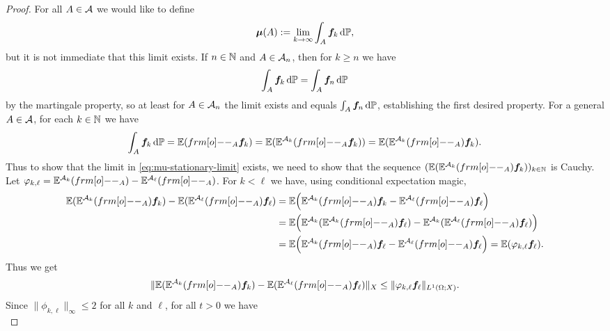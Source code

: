 \begin{proof}
  For all $A \in \mathcal{A}$ we would like to define
  \begin{equation}\label{eq:mu-stationary-limit}
    \bm{\mu}(A) := \lim_{k \to \infty} \int_A \bm{f}_k \, \mathrm{d}\mathbb{P},
  \end{equation}
  but it is not immediate that this limit exists.
  If $n \in \mathbb{N}$ and $A \in \mathcal{A}_{n}$, then for $k \geq n$ we have
  \begin{equation*}
    \int_A \bm{f}_k \, \mathrm{d}\mathbb{P} = \int_A \bm{f}_n \, \mathrm{d} \mathbb{P}
  \end{equation*}
  by the martingale property, so at least for $A \in \mathcal{A}_{n}$ the limit exists and equals $\int_A \bm{f}_n \, \mathrm{d}\mathbb{P}$, establishing the first desired property.
  For a general $A \in \mathcal{A}$, for each $k \in \mathbb{N}$ we have
  \begin{equation*}
     \int_A \mb{f}_k \, \dd\P = \E( \1_{A}\mb{f}_k) = \E(\E^{\mc{A}_k}( \1_{A} \mb{f}_k)) = \E(\E^{\mc{A}_k}(\1_{A}) \mb{f}_k ).
   \end{equation*}
   Thus to show that the limit in \eqref{eq:mu-stationary-limit} exists, we need to show that the sequence $(\E(\E^{\mc{A}_k}( \1_{A}) \mb{f}_k ))_{k \in \N}$ is Cauchy.
   Let $\phi_{k,\ell} = \E^{\mc{A}_k}(\1_{A}) - \E^{\mc{A}_\ell}( \1_{A})$.
   For $k < \ell$ we have, using conditional expectation magic,
   \begin{equation*}
     \begin{aligned}
       \E(\E^{\mc{A}_k}(\1_{A}) \mb{f}_k  ) - \E(\E^{\mc{A}_\ell}( \1_{A}) \mb{f}_\ell )
       &= \E \Big( \E^{\mc{A}_k}(\1_{A}) \mb{f}_k  - \E^{\mc{A}_\ell}( \1_{A}) \mb{f}_{\ell} \Big) \\
       &= \E \Big(  \E^{\mc{A}_{k}}(\E^{\mc{A}_k}(\1_{A})\mb{f}_\ell ) - \E^{\mc{A}_{k}}( \E^{\mc{A}_\ell}( \1_{A}) \mb{f}_{\ell} )\Big) \\
       &= \E \Big(  \E^{\mc{A}_k}(\1_{A}) \mb{f}_\ell  - \E^{\mc{A}_\ell}( \1_{A}) \mb{f}_{\ell}  \Big) 
       = \E ( \phi_{k,\ell} \mb{f}_\ell ).
     \end{aligned}
   \end{equation*}
   Thus we get
   \begin{equation*}
     \|\E(\E^{\mc{A}_k}(\1_{A}) \mb{f}_k ) - \E( \E^{\mc{A}_\ell}( \1_{A}) \mb{f}_\ell)\|_{X}
     \leq \|\phi_{k,\ell} \mb{f}_\ell \|_{L^1(\Omega;X)}.
   \end{equation*}
   Since $\|\phi_{k,\ell}\|_\infty \leq 2$ for all $k$ and $\ell$, for all $t > 0$ we have
   \begin{equation*}

\end{equation*}
\end{proof}
